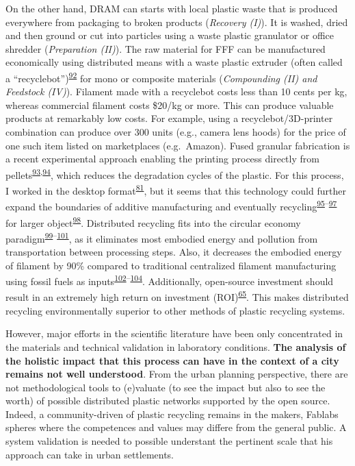 \documentclass[
  12pt,
  a4paperpaper,
  onecolumn]{article}
\begin{document}
On the other hand, DRAM can starts with local plastic waste that is
produced everywhere from packaging to broken products (\emph{Recovery
(I)}). It is washed, dried and then ground or cut into particles using a
waste plastic granulator or office shredder (\emph{Preparation (II)}).
The raw material for FFF can be manufactured economically using
distributed means with a waste plastic extruder (often called a
``recyclebot'')\textsuperscript{\protect\hyperlink{ref-Baechler2013}{92}}
for mono or composite materials (\emph{Compounding (II) and Feedstock
(IV)}). Filament made with a recyclebot costs less than 10 cents per kg,
whereas commercial filament costs \$20/kg or more. This can produce
valuable products at remarkably low costs. For example, using a
recyclebot/3D-printer combination can produce over 300 units (e.g.,
camera lens hoods) for the price of one such item listed on marketplaces
(e.g.~Amazon). Fused granular fabrication is a recent experimental
approach enabling the printing process directly from
pellets\textsuperscript{\protect\hyperlink{ref-JustinoNetto2021}{93},\protect\hyperlink{ref-netto2022}{94}},
which reduces the degradation cycles of the plastic. For this process, I
worked in the desktop
format\textsuperscript{\protect\hyperlink{ref-Arthur2020}{81}}, but it
seems that this technology could further expand the boundaries of
additive manufacturing and eventually
recycling\textsuperscript{\protect\hyperlink{ref-billah2021}{95}--\protect\hyperlink{ref-Byard2019}{97}}
for larger
object\textsuperscript{\protect\hyperlink{ref-petsiuk2022}{98}}.
Distributed recycling fits into the circular economy
paradigm\textsuperscript{\protect\hyperlink{ref-Zhong2018}{99}--\protect\hyperlink{ref-Despeisse2016}{101}},
as it eliminates most embodied energy and pollution from transportation
between processing steps. Also, it decreases the embodied energy of
filament by 90\% compared to traditional centralized filament
manufacturing using fossil fuels as
inputs\textsuperscript{\protect\hyperlink{ref-Kreiger2013}{102}--\protect\hyperlink{ref-Horta2017}{104}}.
Additionally, open-source investment should result in an extremely high
return on investment
(ROI)\textsuperscript{\protect\hyperlink{ref-Pearce2020a}{65}}. This
makes distributed recycling environmentally superior to other methods of
plastic recycling systems.

However, major efforts in the scientific literature have been only
concentrated in the materials and technical validation in laboratory
conditions. \textbf{The analysis of the holistic impact that this
process can have in the context of a city remains not well understood}.
From the urban planning perspective, there are not methodological tools
to (e)valuate (to see the impact but also to see the worth) of possible
distributed plastic networks supported by the open source. Indeed, a
community-driven of plastic recycling remains in the makers, Fablabs
spheres where the competences and values may differe from the general
public. A system validation is needed to possible understant the
pertinent scale that his approach can take in urban settlements.
\end{document}

